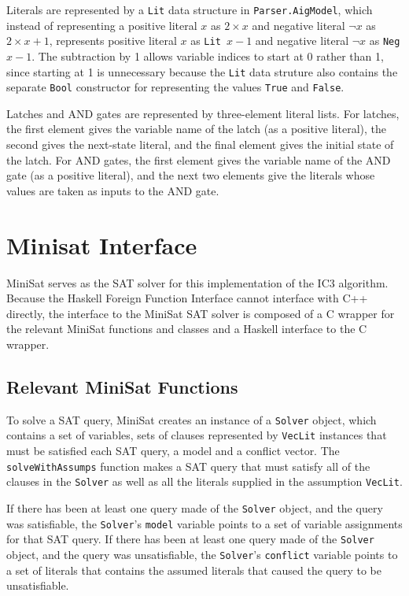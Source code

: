 \documentclass[12pt,a4paper,twoside,openright]{report}
\begin{document}
Literals are represented by a \verb,Lit, data structure in \verb,Parser.AigModel,,
which instead of representing a positive literal $x$ as $2 \times x$ and negative
literal $\neg x$ as $2 \times x + 1$, represents positive literal $x$ as
\verb,Lit ,$x - 1$ and negative literal $\neg x$ as \verb,Neg ,$x - 1$. The subtraction
by 1 allows variable indices to start at 0 rather than 1, since starting at 1 is
unnecessary because the \verb,Lit, data struture also contains the separate
\verb,Bool, constructor for representing the values \verb,True, and \verb,False,.

Latches and AND gates are represented by three-element literal lists.
For latches, the first element gives the variable name of the latch (as a positive literal),
the second gives the next-state literal, and the final element gives the initial state
of the latch. For AND gates, the first element gives the variable name of the AND gate
(as a positive literal), and the next two elements give the literals whose values are taken
as inputs to the AND gate.

\section{Minisat Interface}

MiniSat serves as the SAT solver for this implementation of the IC3 algorithm.
Because the Haskell Foreign Function Interface cannot interface with C++ directly,
the interface to the MiniSat SAT solver is composed of a C wrapper for the relevant
MiniSat functions and classes and a Haskell interface to the C wrapper.

\subsection{Relevant MiniSat Functions}

To solve a SAT query, MiniSat creates an instance of a \verb,Solver, object,
which contains a set of variables, sets of clauses represented by \verb,VecLit, instances
that must be satisfied each SAT query, a model and a conflict vector.
The \verb,solveWithAssumps, function makes a SAT query that must satisfy all of the clauses
in the \verb,Solver, as well as all the literals supplied in the assumption \verb,VecLit,.

If there has been at least one query made of the \verb,Solver, object, and the query was
satisfiable, the \verb,Solver,'s \verb,model, variable points to a set of variable assignments
for that SAT query.
If there has been at least one query made of the \verb,Solver, object, and the query was
unsatisfiable, the \verb,Solver,'s \verb,conflict, variable points to a set of literals that
contains the assumed literals that caused the query to be unsatisfiable.
\end{document}
